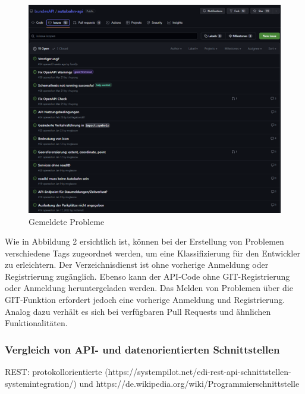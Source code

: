\documentclass[notitlepage, hidelinks]{article}
\begin{document}
\begin{figure}[H]
\centering
  \includegraphics[width=\textwidth]{images/gitissues.png}
  \caption{Gemeldete Probleme}
  \label{fig:gitissues}
\end{figure}

Wie in Abbildung 2 ersichtlich ist, können bei der Erstellung von Problemen verschiedene Tags zugeordnet werden, um eine Klassifizierung für den Entwickler zu erleichtern.
Der Verzeichnisdienst ist ohne vorherige Anmeldung oder Registrierung zugänglich. Ebenso kann der API-Code ohne GIT-Registrierung oder Anmeldung heruntergeladen werden. Das Melden von Problemen über die GIT-Funktion erfordert jedoch eine vorherige Anmeldung und Registrierung. Analog dazu verhält es sich bei verfügbaren Pull Requests und ähnlichen Funktionalitäten.

\subsubsection{Vergleich von API- und datenorientierten Schnittstellen}
REST: protokollorientierte (https://systempilot.net/edi-rest-api-schnittstellen-systemintegration/)
und https://de.wikipedia.org/wiki/Programmierschnittstelle
\end{document}
